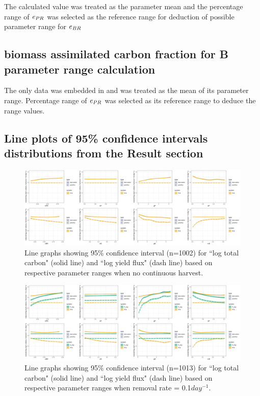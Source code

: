 \documentclass[../thesis.tex]{subfiles} %
\begin{document}
The calculated value was treated as the parameter mean and the percentage range of $e_{PR}$ was selected as the reference range for deduction of possible parameter range for $e_{BR}$

\subsection{biomass assimilated carbon fraction for B parameter range calculation}
The only data was embedded in \autocite{cochran1988estimation} and was treated as the mean of its parameter range.  Percentage range of $e_{PR}$ was selected as its reference range to deduce the range values.

\subsection{Line plots of 95\% confidence intervals distributions from the Result section}
\begin{figure}[H]
    \centering
    \includegraphics[width=\linewidth]{../result/var_00.png}
    \caption[95\% distribution for no harvest]{Line graphs showing 95\% confidence interval (n=1002) for ``log total carbon" (solid line) and ``log yield flux" (dash line) based on respective parameter ranges when no continuous harvest.}
    \label{fig:v00}
\end{figure}

\begin{figure}[H]
    \centering
    \includegraphics[width=\linewidth]{../result/var_01.png}
    \caption[95\% distribution for $x=0.1day^{-1}$]{Line graphs showing 95\% confidence interval (n=1013) for ``log total carbon" (solid line) and ``log yield flux" (dash line) based on respective parameter ranges when removal rate = 0.1$day^{-1}$.}
    \label{fig:v01}
\end{figure}
\end{document}
